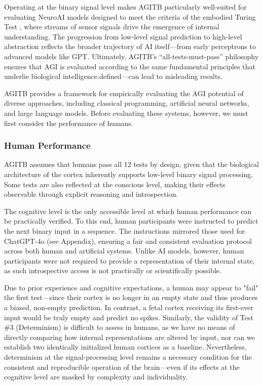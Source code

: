 \documentclass{article}
\begin{document}
Operating at the binary signal level makes AGITB particularly well-suited for evaluating NeuroAI models designed to meet the criteria of the embodied Turing Test \cite{Zador2023}, where streams of sensor signals drive the emergence of internal understanding. The progression from low-level signal prediction to high-level abstraction reflects the broader trajectory of AI itself—from early perceptrons to advanced models like GPT. Ultimately, AGITB’s “all-tests-must-pass” philosophy ensures that AGI is evaluated according to the same fundamental principles that underlie biological intelligence.defined—can lead to misleading results.

AGITB provides a framework for empirically evaluating the AGI potential of diverse approaches, including classical programming, artificial neural networks, and large language models. Before evaluating these systems, however, we must first consider the performance of humans.

\subsubsection{Human Performance}

AGITB assumes that humans pass all 12 tests by design, given that the biological architecture of the cortex inherently supports low-level binary signal processing. Some tests are also reflected at the conscious level, making their effects observable through explicit reasoning and introspection.

The cognitive level is the only accessible level at which human performance can be practically verified. To this end, human participants were instructed to predict the next binary input in a sequence. The instructions mirrored those used for ChatGPT-4o (see Appendix), ensuring a fair and consistent evaluation protocol across both human and artificial systems. Unlike AI models, however, human participants were not required to provide a representation of their internal state, as such introspective access is not practically or scientifically possible.

Due to prior experience and cognitive expectations, a human may appear to "fail" the first test—since their cortex is no longer in an empty state and thus produces a biased, non-empty prediction. In contrast, a fetal cortex receiving its first-ever input would be truly empty and predict no spikes. Similarly, the validity of Test \#3 (Determinism) is difficult to assess in humans, as we have no means of directly comparing how internal representations are altered by input, nor can we establish two identically initialized human cortices as a baseline. Nevertheless, determinism at the signal-processing level remains a necessary condition for the consistent and reproducible operation of the brain—even if its effects at the cognitive level are masked by complexity and individuality.
\end{document}
